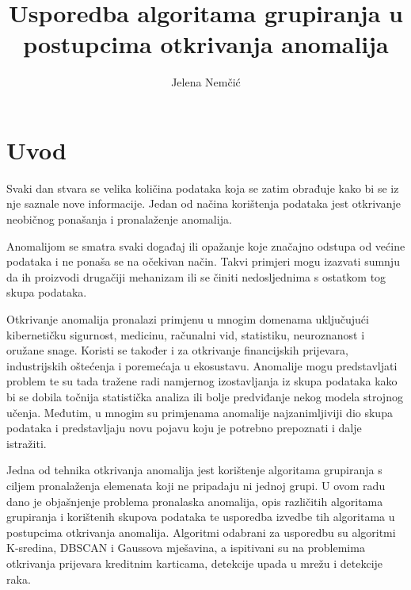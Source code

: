 \documentclass[utf8, diplomski, numeric]{fer}
\begin{document}

\title{Usporedba algoritama grupiranja u postupcima otkrivanja anomalija}

\author{Jelena Nemčić}

\maketitle



\zahvala{}

\tableofcontents

\chapter{Uvod}

Svaki dan stvara se velika količina podataka koja se zatim obrađuje kako bi se iz nje saznale nove informacije. Jedan od načina korištenja podataka jest otkrivanje neobičnog ponašanja i pronalaženje anomalija.

Anomalijom se smatra svaki događaj ili opažanje koje značajno odstupa od većine podataka i ne ponaša se na očekivan način. Takvi primjeri mogu izazvati sumnju da ih proizvodi drugačiji mehanizam ili se činiti nedosljednima s ostatkom tog skupa podataka.

Otkrivanje anomalija pronalazi primjenu u mnogim domenama uključujući kibernetičku sigurnost, medicinu, računalni vid, statistiku, neuroznanost i oružane snage. Koristi se također i za otkrivanje financijskih prijevara, industrijskih oštećenja i poremećaja u ekosustavu. Anomalije mogu predstavljati problem te su tada tražene radi namjernog izostavljanja iz skupa podataka kako bi se dobila točnija statistička analiza ili bolje predviđanje nekog modela strojnog učenja. Međutim, u mnogim su primjenama anomalije najzanimljiviji dio skupa podataka i predstavljaju novu pojavu koju je potrebno prepoznati i dalje istražiti.

Jedna od tehnika otkrivanja anomalija jest korištenje algoritama grupiranja s ciljem pronalaženja elemenata koji ne pripadaju ni jednoj grupi. U ovom radu dano je objašnjenje problema pronalaska anomalija, opis različitih algoritama grupiranja i korištenih skupova podataka te usporedba izvedbe tih algoritama u postupcima otkrivanja anomalija. Algoritmi odabrani za usporedbu su algoritmi K-sredina, DBSCAN i Gaussova mješavina, a ispitivani su na problemima otkrivanja prijevara kreditnim karticama, detekcije upada u mrežu i detekcije raka.
\end{document}
